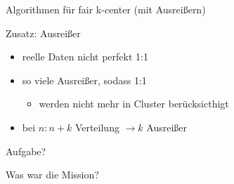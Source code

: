 \begin{frame}{Algorithmen für fair k-center (mit Ausreißern)}
    \begin{minipage}[t]{0.5\textwidth}
    \end{minipage}
    \hfill
    \begin{minipage}[t]{0.45\textwidth}
        Zusatz: Ausreißer
        \begin{itemize}
            \item reelle Daten nicht perfekt 1:1
            \item so viele Ausreißer, sodass 1:1
            \begin{itemize}
                \item werden nicht mehr in Cluster berücksicthigt
            \end{itemize}
            \item bei $n:n+k$ Verteilung $\rightarrow k$ Ausreißer 
        \end{itemize}
    \end{minipage} 
\end{frame}











\begin{frame}{Aufgabe?}
    \begin{LARGE}
        \begin{center}
            \color{hhuBlau}
            \Large Was war die Mission?
        \end{center}
    \end{LARGE} 
\end{frame}


